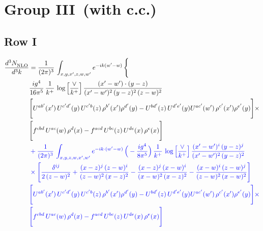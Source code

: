 \documentclass[9pt]{article}
\newcommand{\nc}{\color{blue}}
\numberwithin{equation}{section}
\begin{document}
\section{Group III\, (with c.c.)}
\subsection{Row I}
\begin{align}
     \frac{d^{3}N_{\rm NLO}^{\rm}}{d^{3}k}  & =  \frac{1}{(2\pi)^{3}}\, \int_{x,y,x',z,w,w^{\prime}} e^{-ik(w^{\prime}-w)}\, \Bigg\{\notag \\ & \frac{ig^{4}}{16\pi^{5}}\,\frac{1}{k^{+}}\,\log{\left[\frac{\vee}{k^{+}}\right]}\, \frac{(x'-w')\cdot (y-z)}{(x'-w')^{2}\,(y-z)^{2}\,(z-w)^{2}}\notag \\ &  \Bigg[U^{ab'}(x')\,U^{c'd'}(y)\,U^{c'b}(z)\,\rho^{b'}(x')\rho^{d'}(y)-U^{bd'}(z)\,U^{d'e'}(y)U^{ac'}(w')\,\rho^{c'}(x')\rho^{e'}(y)\Bigg]\times\notag \\ & \Bigg[f^{cbd}\,U^{ac}(w)\,\rho^{d}(x)-f^{acd}\, U^{bc}(z)\,U^{de}(x)\,\rho^{e}(x)\Bigg] 
\notag \\ & \nc +\frac{1}{(2\pi)^{3}}\,\int_{x,y,z,w,x',w'}e^{-ik\cdot (w^\prime-w)}\,\Big(-\frac{ig^{4}}{8\pi^{5}}\Big)\,\frac{1}{k^{+}}\,\log{\left[\frac{\vee}{k^{+}}\right]}\,\frac{(x'-w')^{i}\,(y-z)^{j}}{(x'-w')^{2}\,(y-z)^{2}}\notag \\ & \nc \times \Bigg[\frac{\delta^{ij}}{2\,(z-w)^{2}}+\frac{(x-z)^{j}\,(z-w)^{i}}{(z-w)^{2}\,(x-z)^{2}}-\frac{(x-z)^{j}\,(x-w)^{i}}{(x-w)^{2}\,(x-z)^{2}}-\frac{(x-w)^{i}\,(z-w)^{j}}{(z-w)^{2}\,(x-w)^{2}}\Bigg]\notag \\ & \nc \Bigg[U^{ab'}(x')\,U^{c'd'}(y)\,U^{c'b}(z)\,\rho^{b'}(x')\rho^{d'}(y)-U^{bd'}(z)\,U^{d'e'}(y)U^{ac'}(w')\,\rho^{c'}(x')\rho^{e'}(y)\Bigg]\times\notag \\ & \nc \Bigg[f^{cbd}\,U^{ac}(w)\,\rho^{d}(x)-f^{acd}\, U^{bc}(z)\,U^{de}(x)\,\rho^{e}(x)\Bigg]
\end{align}
\end{document}
